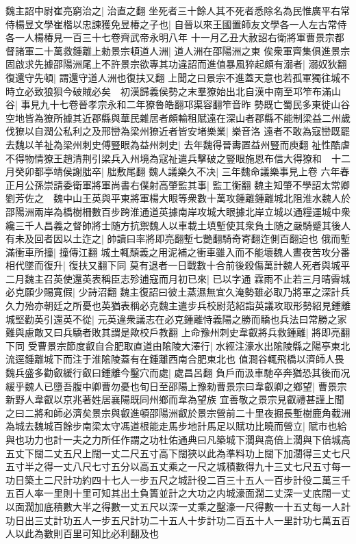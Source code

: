 魏主詔中尉崔亮窮治之|{
	治直之翻}
坐死者三十餘人其不死者悉除名為民惟廣平右常侍楊昱文學崔楷以忠諫獲免昱椿之子也|{
	自晉以來王國置師友文學各一人左古常侍各一人楊椿見一百三十七卷齊武帝永明八年}
十一月乙丑大赦詔右衛將軍曹景宗都督諸軍二十萬救鍾離上勑景宗頓道人洲|{
	道人洲在邵陽洲之東}
俟衆軍齊集俱進景宗固啟求先據邵陽洲尾上不許景宗欲專其功違詔而進值暴風猝起頗有溺者|{
	溺奴狄翻}
復還守先頓|{
	謂還守道人洲也復扶又翻}
上聞之曰景宗不進蓋天意也若孤軍獨往城不時立必致狼狽今破賊必矣　初漢歸義侯勢之末羣獠始出北自漢中南至邛笮布滿山谷|{
	事見九十七卷晉孝宗永和二年獠魯皓翻邛渠容翻笮音昨}
勢既亡蜀民多東徙山谷空地皆為獠所據其近郡縣與華民雜居者頗輸租賦遠在深山者郡縣不能制梁益二州歲伐獠以自潤公私利之及邢巒為梁州獠近者皆安堵樂業|{
	樂音洛}
遠者不敢為寇巒既罷去魏以羊祉為梁州刺史傅豎眼為益州刺史|{
	去年魏得晉夀置益州豎而庾翻}
祉性酷虐不得物情獠王趙清荆引梁兵入州境為寇祉遣兵擊破之豎眼施恩布信大得獠和　十二月癸卯都亭靖侯謝朏卒|{
	朏敷尾翻}
魏人議樂久不决|{
	三年魏命議樂事見上卷}
六年春正月公孫崇請委衛軍將軍尚書右僕射高肇監其事|{
	監工衡翻}
魏主知肇不學詔太常卿劉芳佐之　魏中山王英與平東將軍楊大眼等衆數十萬攻鍾離鍾離城北阻淮水魏人於邵陽洲兩岸為橋樹柵數百步跨淮通道英據南岸攻城大眼據北岸立城以通糧運城中衆纔三千人昌義之督帥將士随方抗禦魏人以車載土填塹使其衆負土随之嚴騎蹙其後人有未及回者因以土迮之|{
	帥讀曰率將即亮翻塹七艷翻騎奇寄翻迮側百翻迫也}
俄而塹滿衝車所撞|{
	撞傳江翻}
城土輒頹義之用泥補之衝車雖入而不能壞魏人晝夜苦攻分番相代墜而復升|{
	復扶又翻下同}
莫有退者一日戰數十合前後殺傷萬計魏人死者與城平二月魏主召英使還英表稱臣志殄逋寇而月初已來|{
	已以字通}
霖雨不止若三月晴霽城必克願少賜寛假|{
	少詩沼翻}
魏主復詔曰彼土蒸濕無宜久淹勢雖必取乃將軍之深計兵久力殆亦朝廷之所憂也英猶表稱必克魏主遣步兵校尉范紹詣英議攻取形勢紹見鍾離城堅勸英引還英不從|{
	元英違衆議志在必克鍾離恃義陽之勝而驕也兵法曰常勝之家難與慮敵又曰兵驕者敗其謂是歟校戶教翻}
上命豫州刺史韋叡將兵救鍾離|{
	將即亮翻下同}
受曹景宗節度叡自合肥取直道由隂陵大澤行|{
	水經注濠水出隂陵縣之陽亭東北流逕鍾離城下而注于淮隂陵蓋有在鍾離西南合肥東北也}
值澗谷輒飛橋以濟師人畏魏兵盛多勸叡緩行叡曰鍾離今鑿穴而處|{
	處昌呂翻}
負戶而汲車馳卒奔猶恐其後而况緩乎魏人已墮吾腹中卿曹勿憂也旬日至邵陽上豫勑曹景宗曰韋叡卿之鄉望|{
	曹景宗新野人韋叡以京兆著姓居襄陽既同州鄉而韋為望族}
宜善敬之景宗見叡禮甚謹上聞之曰二將和師必濟矣景宗與叡進頓邵陽洲叡於景宗營前二十里夜掘長塹樹鹿角截洲為城去魏城百餘步南梁太守馮道根能走馬步地計馬足以賦功比曉而營立|{
	賦市也給與也功力也計一夫之力所任作謂之功杜佑通典曰凡築城下濶與高倍上濶與下倍城高五丈下闊二丈五尺上闊一丈二尺五寸高下闊狹以此為準料功上闊下加濶得三丈七尺五寸半之得一丈八尺七寸五分以高五丈乘之一尺之城積數得九十三丈七尺五寸每一功日築土二尺計功約四十七人一步五尺之城計役二百三十五人一百步計役二萬三千五百人率一里則十里可知其出土負簣並計之大功之内城濠面濶二丈深一丈㡳闊一丈以面濶加底積數大半之得數一丈五尺以深一丈乘之鑿濠一尺得數一十五丈每一人計功日出三丈計功五人一步五尺計功二十五人十步計功二百五十人一里計功七萬五百人以此為數則百里可知比必利翻及也}
